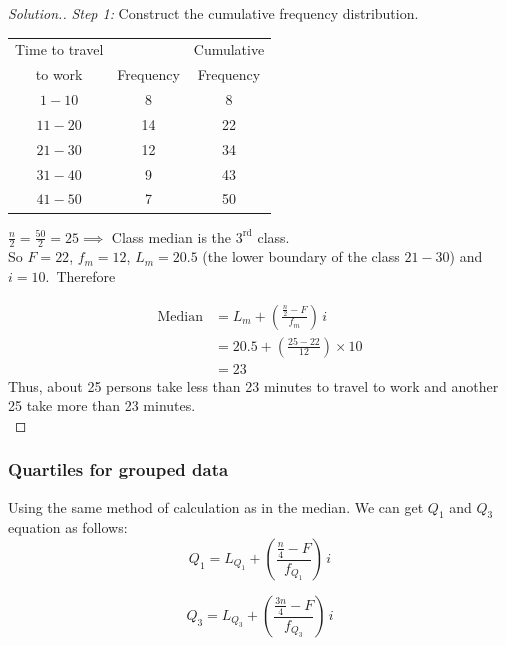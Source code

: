 \documentclass[11pt,a4paper]{article}
\theoremstyle{definition}
\newenvironment{solution}
  {\renewcommand{\qedsymbol}{}\begin{proof}[\textit{Solution}.]}
  {\end{proof}}
\begin{document}
\begin{solution}
\textit{Step 1:} Construct the cumulative frequency distribution.


\begin{table}[H]
\centering
\begin{tabular}{|c|c|c|}
\hline
Time to travel &  & Cumulative\\
to work        & Frequency & Frequency\\
\hline
$1 - 10$ & 8    & 8\\
$11 - 20$ & 14  & 22\\
$21 - 30$ & 12  & 34\\
$31 - 40$ & 9   & 43\\
$41 - 50$ & 7   & 50\\
\hline
\end{tabular}
\end{table}

${\frac{n}{2}=\frac{50}{2}=25}\implies$ Class median is the $3^{\text{rd}}$ class.\\

So $F=22$, $f_m=12$, $L_m=20.5$ (the lower boundary of the class $21-30$) and $i=10$.\  Therefore

\begin{align*}
\text{Median} & = L_m + \left(\frac{\frac{n}{2}-F}{f_m}\right)\, i\\[1ex]
              & = 20.5 + \left(\frac{25-22}{12}\right)\times 10\\
              & = 23
\end{align*}
Thus, about 25 persons take less than 23 minutes to travel to work and another 25 take more than 23 minutes.\\[1ex]
\end{solution}




\subsubsection{Quartiles for grouped data}
Using the same method of calculation as in the median. We can get $Q_1$ and $Q_3$ equation as follows:
\[Q_1 = L_{Q_1} + \left(\frac{\frac{n}{4}- F}{f_{Q_1}}\right) \, i\]

\[Q_3 = L_{Q_3} + \left(\frac{\frac{3n}{4}- F}{f_{Q_3}}\right) \, i\]\\
\end{document}
